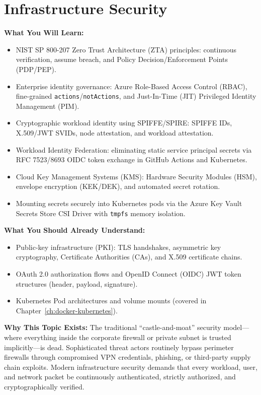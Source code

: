 \chapter{Infrastructure Security}
\label{ch:infrastructure-security}

\begin{chaptergoalsbox}
\textbf{What You Will Learn:}
\begin{itemize}[leftmargin=12pt]
  \item NIST SP 800-207 Zero Trust Architecture (ZTA) principles: continuous verification, assume breach, and Policy Decision/Enforcement Points (PDP/PEP).
  \item Enterprise identity governance: Azure Role-Based Access Control (RBAC), fine-grained \texttt{actions}/\texttt{notActions}, and Just-In-Time (JIT) Privileged Identity Management (PIM).
  \item Cryptographic workload identity using SPIFFE/SPIRE: SPIFFE IDs, X.509/JWT SVIDs, node attestation, and workload attestation.
  \item Workload Identity Federation: eliminating static service principal secrets via RFC 7523/8693 OIDC token exchange in GitHub Actions and Kubernetes.
  \item Cloud Key Management Systems (KMS): Hardware Security Modules (HSM), envelope encryption (KEK/DEK), and automated secret rotation.
  \item Mounting secrets securely into Kubernetes pods via the Azure Key Vault Secrets Store CSI Driver with \texttt{tmpfs} memory isolation.
\end{itemize}

\textbf{What You Should Already Understand:}
\begin{itemize}[leftmargin=12pt]
  \item Public-key infrastructure (PKI): TLS handshakes, asymmetric key cryptography, Certificate Authorities (CAs), and X.509 certificate chains.
  \item OAuth 2.0 authorization flows and OpenID Connect (OIDC) JWT token structures (header, payload, signature).
  \item Kubernetes Pod architectures and volume mounts (covered in Chapter~\ref{ch:docker-kubernetes}).
\end{itemize}

\textbf{Why This Topic Exists:}
The traditional ``castle-and-moat'' security model---where everything inside the corporate firewall or private subnet is trusted implicitly---is dead. Sophisticated threat actors routinely bypass perimeter firewalls through compromised VPN credentials, phishing, or third-party supply chain exploits. Modern infrastructure security demands that every workload, user, and network packet be continuously authenticated, strictly authorized, and cryptographically verified.


\end{chaptergoalsbox}
